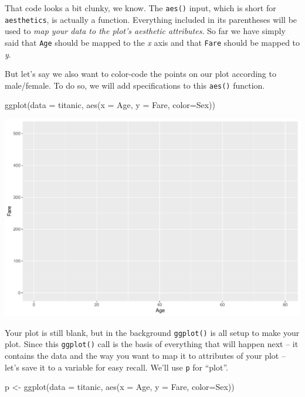 \documentclass[
]{book}
\newenvironment{Shaded}{\begin{snugshade}}{\end{snugshade}}
\newcommand{\AttributeTok}[1]{\textcolor[rgb]{0.77,0.63,0.00}{#1}}
\newcommand{\FunctionTok}[1]{\textcolor[rgb]{0.00,0.00,0.00}{#1}}
\newcommand{\NormalTok}[1]{#1}
\newcommand{\OtherTok}[1]{\textcolor[rgb]{0.56,0.35,0.01}{#1}}
\begin{document}
That code looks a bit clunky, we know. The \texttt{aes()} input, which is short for \texttt{aesthetics}, is actually a function. Everything included in its parentheses will be used to \emph{map your data to the plot's aesthetic attributes}. So far we have simply said that \texttt{Age} should be mapped to the \emph{x} axis and that \texttt{Fare} should be mapped to \emph{y}.

But let's say we also want to color-code the points on our plot according to male/female. To do so, we will add specifications to this \texttt{aes()} function.

\begin{Shaded}
\begin{Highlighting}[]
\FunctionTok{ggplot}\NormalTok{(}\AttributeTok{data =}\NormalTok{ titanic, }
       \FunctionTok{aes}\NormalTok{(}\AttributeTok{x =}\NormalTok{ Age, }\AttributeTok{y =}\NormalTok{ Fare, }\AttributeTok{color=}\NormalTok{Sex))}
\end{Highlighting}
\end{Shaded}

\includegraphics[width=694.08px]{figures/unnamed-chunk-158-1}

Your plot is still blank, but in the background \texttt{ggplot()} is all setup to make your plot. Since this \texttt{ggplot()} call is the basis of everything that will happen next -- it contains the data and the way you want to map it to attributes of your plot -- let's save it to a variable for easy recall. We'll use \texttt{p} for ``plot''.

\begin{Shaded}
\begin{Highlighting}[]
\NormalTok{p }\OtherTok{\textless{}{-}} \FunctionTok{ggplot}\NormalTok{(}\AttributeTok{data =}\NormalTok{ titanic, }
       \FunctionTok{aes}\NormalTok{(}\AttributeTok{x =}\NormalTok{ Age, }\AttributeTok{y =}\NormalTok{ Fare, }\AttributeTok{color=}\NormalTok{Sex))}
\end{Highlighting}
\end{Shaded}
\end{document}
